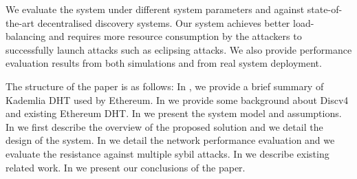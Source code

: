 We evaluate the system under different system parameters and against state-of-the-art decentralised discovery systems. Our system achieves better load-balancing and requires more resource consumption by the attackers to successfully launch attacks such as eclipsing attacks. We also provide performance evaluation results from both simulations and from real system deployment.  
    
The structure of the paper is as follows: In , we provide a brief summary of Kademlia DHT used by Ethereum. In  we provide some background about Discv4 and existing Ethereum DHT. 
In  we present the system model and assumptions. 
In  we first describe the overview of the proposed solution and  we detail the design of the system. 
In  we detail the network performance evaluation and we evaluate the resistance against multiple sybil attacks. 
In  we describe existing related work.
In  we present our conclusions of the paper.